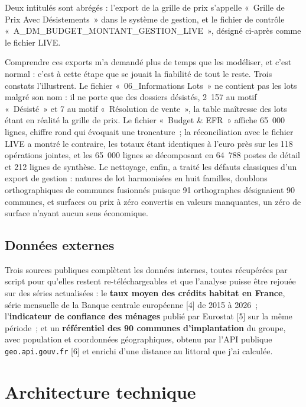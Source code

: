 Deux intitulés sont abrégés : l'export de la grille de prix s'appelle «~Grille de Prix Avec
Désistements~» dans le système de gestion, et le fichier de contrôle
«~A\_DM\_BUDGET\_MONTANT\_GESTION\_LIVE~», désigné ci-après comme le fichier LIVE.

Comprendre ces exports m'a demandé plus de temps que les modéliser, et c'est normal : c'est à
cette étape que se jouait la fiabilité de tout le reste. Trois constats l'illustrent. Le
fichier «~06\_Informations Lots~» ne contient pas les lots malgré son nom : il ne porte que des
dossiers désistés, 2~157 au motif «~Désisté~» et 7 au motif «~Résolution de vente~», la table
maîtresse des lots étant en réalité la grille de prix. Le fichier «~Budget \& EFR~» affiche
65~000 lignes, chiffre rond qui évoquait une troncature~; la réconciliation avec le fichier
LIVE a montré le contraire, les totaux étant identiques à l'euro près sur les 118 opérations
jointes, et les 65~000 lignes se décomposant en 64~788 postes de détail et 212 lignes de
synthèse. Le nettoyage, enfin, a traité les défauts classiques d'un export de gestion : natures
de lot harmonisées en huit familles, doublons orthographiques de communes fusionnés puisque 91
orthographes désignaient 90 communes, et surfaces ou prix à zéro convertis en valeurs
manquantes, un zéro de surface n'ayant aucun sens économique.

\hypertarget{donnuxe9es-externes}{%
\subsection{Données externes}\label{donnuxe9es-externes}}

Trois sources publiques complètent les données internes, toutes récupérées par script pour
qu'elles restent re-téléchargeables et que l'analyse puisse être rejouée sur des séries
actualisées : le \textbf{taux moyen des crédits habitat en France}, série mensuelle de la Banque
centrale européenne {[}4{]} de 2015 à 2026~; l'\textbf{indicateur de confiance des ménages} publié par
Eurostat {[}5{]} sur la même période~; et un \textbf{référentiel des 90 communes d'implantation} du
groupe, avec population et coordonnées géographiques, obtenu par l'API publique
\texttt{geo.api.gouv.fr} {[}6{]} et enrichi d'une distance au littoral que j'ai calculée.

\hypertarget{architecture-technique}{%
\section{Architecture technique}\label{architecture-technique}}

